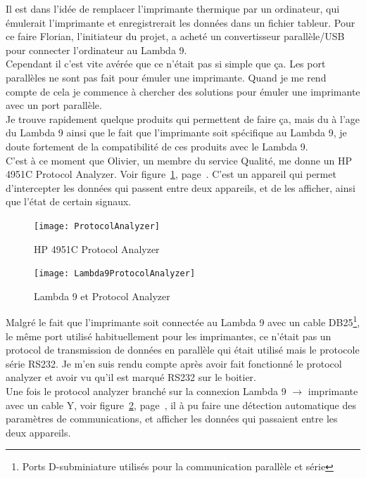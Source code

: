 \documentclass[12pt]{article}
\begin{document}
Il est dans l'idée de remplacer l'imprimante thermique par un ordinateur, qui émulerait l'imprimante et enregistrerait les données dans un fichier tableur.
Pour ce faire Florian, l'initiateur du projet, a acheté un convertisseur parallèle/USB pour connecter l'ordinateur au Lambda 9.\\
Cependant il c'est vite avérée que ce n'était pas si simple que ça.
Les port parallèles ne sont pas fait pour émuler une imprimante.
Quand je me rend compte de cela je commence à chercher des solutions pour émuler une imprimante avec un port parallèle.\\
Je trouve rapidement quelque produits qui permettent de faire ça, mais du à l'age du Lambda 9 ainsi que le fait que l'imprimante soit spécifique au Lambda 9, je doute fortement de la compatibilité de ces produits avec le Lambda 9.\\
C'est à ce moment que Olivier, un membre du service Qualité, me donne un HP 4951C Protocol Analyzer.
Voir figure~\ref{fig:protocolAnalyzer}, page~\pageref{fig:protocolAnalyzer}.
C'est un appareil qui permet d'intercepter les données qui passent entre deux appareils, et de les afficher, ainsi que l'état de certain signaux.\\
\begin{figure}[H]
	\centering
	\texttt{[image: ProtocolAnalyzer]}
	\caption{HP 4951C Protocol Analyzer}
	\label{fig:protocolAnalyzer}
\end{figure}
\begin{figure}[H]
	\centering
	\texttt{[image: Lambda9ProtocolAnalyzer]}
	\caption{Lambda 9 et Protocol Analyzer}
	\label{fig:lambda9HP}
\end{figure}
Malgré le fait que l'imprimante soit connectée au Lambda 9 avec un cable DB25\footnote{Ports D-subminiature utilisés pour la communication parallèle et série}, le même port utilisé habituellement pour les imprimantes, ce n'était pas un protocol de transmission de données en parallèle qui était utilisé mais le protocole série RS232.
Je m'en suis rendu compte après avoir fait fonctionné le protocol analyzer et avoir vu qu'il est marqué RS232 sur le boitier.\\
Une fois le protocol analyzer branché sur la connexion Lambda 9 $\rightarrow$ imprimante avec un cable Y, voir figure~\ref{fig:lambda9HP}, page~\pageref{fig:lambda9HP}, il à pu faire une détection automatique des paramètres de communications, et afficher les données qui passaient entre les deux appareils.
\end{document}

